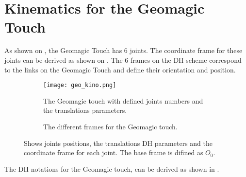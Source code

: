 \section{Kinematics for the Geomagic Touch}

As shown on , the Geomagic Touch has 6 joints.
The coordinate frame for these joints can be derived as shown on . 
The 6 frames on the DH scheme correspond to the links on the Geomagic Touch and define their orientation and position.


% 






\begin{figure}[H]

	\begin{subfigure}{.49\textwidth}
		\centering
		\texttt{[image: geo\_kino.png]}
		\caption{The Geomagic touch with defined joints numbers and the translations parameters.}
		\label{fig:Endo_plates11}
	\end{subfigure}
	\begin{subfigure}{.49\textwidth}
		\centering
		\vspace{5pt}
		
		\caption{The different frames for the Geomagic touch.}
		\label{fig:dhgeoframe1}
	\end{subfigure}
\caption{Shows joints positions, the translations \gls{DH} parameters and the coordinate frame for each joint. The base frame is difined as $O_{0}$.}
\label{fig:dhnotatso2}
\end{figure}



The DH notations for the Geomagic touch, can be derived as shown in .





